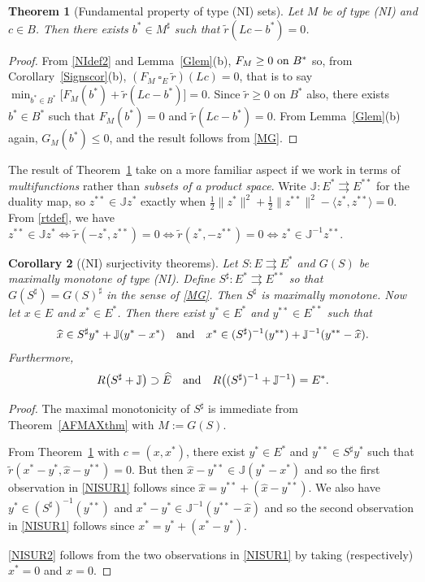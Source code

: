 \documentclass[letterpaper]{article}
\theoremstyle{plain}
\newtheorem{theorem}{Theorem}[section]
\newtheorem{corollary}[theorem]{Corollary}
\theoremstyle{definition}
\numberwithin{equation}{section}
\newcommand{\bra}[2]{\langle#1,#2\rangle}
\newcommand{\dbs}{^{**}}
\newcommand{\half}{{\textstyle\frac{1}{2}}}
\newcommand{\J}{{\mathbb J}}
\newcommand{\minn}{\min\nolimits}
\newcommand{\on}{\hbox{on}}
\newcommand{\quand}{\quad\hbox{and}\quad}
\newcommand{\rt}{\wt r}
\newcommand{\squaree}{\ \square_E\ }
\newcommand{\toto}{\rightrightarrows}
\newcommand{\wh}{\widehat}
\newcommand{\wt}{\widetilde}
\newcommand{\Cor}{Corollary~\ref}
\newcommand{\Lem}{Lemma~\ref}
\newcommand{\Thm}{Theorem~\ref}
\begin{document}
\begin{theorem}[Fundamental property of type (NI) sets]\label{AFRLthm}
Let $M$ be of type (NI) and $c \in B$.  Then there exists $b^* \in M^\sharp$ such that $\rt(Lc - b^*) = 0$.
\end{theorem}
%
\begin{proof}
From \eqref{NIdef2} and \Lem{Glem}(b), $F_M \ge 0\ \on\ B^*$ so, from \Cor{Signscor}(b), $(F_M \squaree \rt)(Lc) = 0$, that is to say $\minn_{b^* \in B^*}\big[F_M(b^*) + \rt(Lc - b^*)\big]= 0$.   Since $\rt \ge 0$ on $B^*$ also, there exists $b^* \in B^*$ such that $F_M(b^*) = 0$ and $\rt(Lc - b^*) = 0$.   From \Lem{Glem}(b) again, $G_M(b^*) \le 0$, and the result follows from \eqref{MG}.   
\end{proof}
%
The result of \Thm{AFRLthm} take on a more familiar aspect if we work in terms of {\em multifunctions} rather than {\em subsets of a product space}.   Write $\J \colon E^* \toto E\dbs$ for the duality map, so $z\dbs \in {\J}z^*$ exactly when $\half\|z^*\|^2 + \half\|z\dbs\|^2 - \bra{z^*}{z\dbs} = 0$.   From \eqref{rtdef}, we have $ z\dbs \in \J z^* \iff \rt(-z^*,z\dbs) = 0 \iff \rt(z^*,-z\dbs) = 0 \iff z^* \in  \J^{-1} z\dbs$.   
\begin{corollary}[(NI) surjectivity theorems]\label{NISURcor}
Let $S\colon E \toto E^*$ and $G(S)$ be maximally monotone of type (NI).  Define $S^\sharp\colon E^* \toto E\dbs$ so that $G(S^\sharp) = G(S)^\sharp$ in the sense of \eqref{MG}.   Then $S^\sharp$ is maximally monotone.   Now let $x \in E$ and $x^* \in E^*$.   Then there exist $y^* \in E^*$ and $y\dbs \in E\dbs$ such that
\begin{equation}\label{NISUR1}
\wh x \in {S^\sharp}y^* + {\J}(y^* - x^*)\quand x^* \in (S^\sharp)^{-1}(y\dbs) + \J^{-1}(y\dbs - \wh x).
\end{equation}
%
Furthermore,
\begin{equation}\label{NISUR2}
R\big({S^\sharp} + {\J}\big) \supset \wh E \quand R\big((S^\sharp)^{-1} + {\J}^{-1}\big) = E^*.
\end{equation}  
\end{corollary}
%
\begin{proof} The maximal monotonicity of $S^\sharp$ is immediate from \Thm{AFMAXthm} with $M := G(S)$.
\par
From \Thm{AFRLthm} with $c = (x,x^*)$, there exist $y^* \in E^*$ and $y\dbs \in S^\sharp y^*$ such that  $\rt(x^* - y^*, \wh x - y\dbs) = 0$.   But then $\wh x - y\dbs \in \J(y^* - x^*)$ and so the first observation in \eqref{NISUR1} follows since $\wh x = y\dbs + (\wh x - y\dbs)$.   We also have $y^* \in (S^\sharp)^{-1}(y\dbs)$ and $x^*  - y^*\in \J^{-1}(y\dbs - \wh x)$ and so the second observation in \eqref{NISUR1} follows since $x^* =  y^* + (x^*  - y^*)$.
\par
\eqref{NISUR2} follows from the two observations in \eqref{NISUR1} by taking (respectively)\break $x^* = 0$ and $x = 0$. 
\end{proof}
\end{document}
